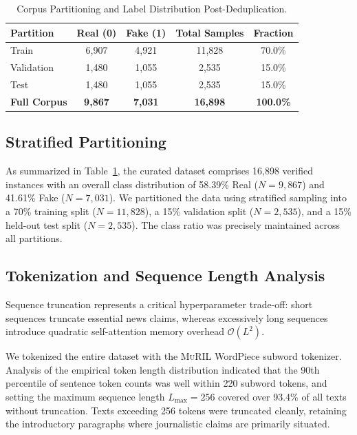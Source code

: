 \documentclass[11pt,a4paper]{article}
\begin{document}
\begin{table}[t]
\centering
\caption{Corpus Partitioning and Label Distribution Post-Deduplication.}
\label{tab:dataset_splits}
\begin{tabular}{lcccc}
\toprule
\textbf{Partition} & \textbf{Real (0)} & \textbf{Fake (1)} & \textbf{Total Samples} & \textbf{Fraction} \\
\midrule
Train & 6,907 & 4,921 & 11,828 & 70.0\% \\
Validation & 1,480 & 1,055 & 2,535 & 15.0\% \\
Test & 1,480 & 1,055 & 2,535 & 15.0\% \\
\midrule
\textbf{Full Corpus} & \textbf{9,867} & \textbf{7,031} & \textbf{16,898} & \textbf{100.0\%} \\
\bottomrule
\end{tabular}
\end{table}

\subsection{Stratified Partitioning}
As summarized in Table~\ref{tab:dataset_splits}, the curated dataset comprises 16,898 verified instances with an overall class distribution of 58.39\% Real ($N=9,867$) and 41.61\% Fake ($N=7,031$). We partitioned the data using stratified sampling into a 70\% training split ($N=11,828$), a 15\% validation split ($N=2,535$), and a 15\% held-out test split ($N=2,535$). The class ratio was precisely maintained across all partitions.

\subsection{Tokenization and Sequence Length Analysis}
Sequence truncation represents a critical hyperparameter trade-off: short sequences truncate essential news claims, whereas excessively long sequences introduce quadratic self-attention memory overhead $\mathcal{O}(L^2)$. 

We tokenized the entire dataset with the \textsc{MuRIL} WordPiece subword tokenizer. Analysis of the empirical token length distribution indicated that the 90th percentile of sentence token counts was well within 220 subword tokens, and setting the maximum sequence length $L_{\max} = 256$ covered over 93.4\% of all texts without truncation. Texts exceeding 256 tokens were truncated cleanly, retaining the introductory paragraphs where journalistic claims are primarily situated.
\end{document}

